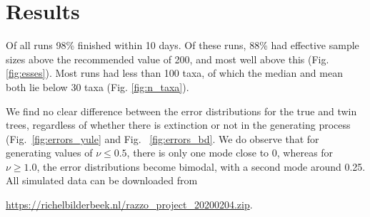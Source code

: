 \section{Results}

Of all runs 98\% finished within 10 days. Of these runs, 88\% had effective sample sizes above the recommended value of 200, and most well above this (Fig. \ref{fig:esses}). Most runs had less than 100 taxa, of which the median and mean both lie below 30 taxa (Fig. \ref{fig:n_taxa}). 

We find no clear difference between the error distributions for the true and twin trees, regardless of whether there is extinction or not in the generating process (Fig.~\ref{fig:errors_yule} and Fig. ~\ref{fig:errors_bd}. We do observe that for generating values of $\nu \leqslant 0.5$, there is only one mode close to 0, whereas for $\nu \geq 1.0$, the error
distributions become bimodal, with a second mode around 0.25. 
All simulated data can be downloaded from 
\begin{sloppypar}
\url{https://richelbilderbeek.nl/razzo_project_20200204.zip}.
\end{sloppypar}

